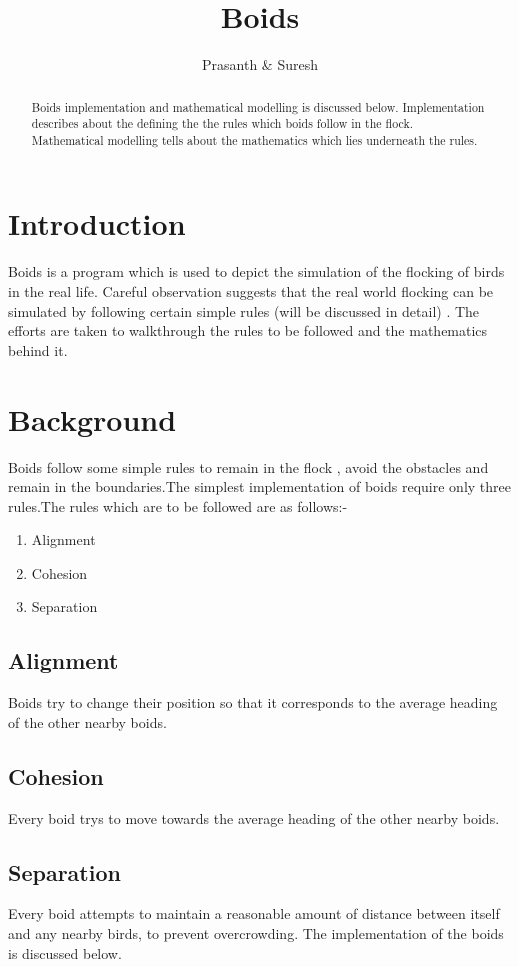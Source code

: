 \documentclass[a4paper]{article}
\title{Boids}
\author{Prasanth \& Suresh}
\begin{document}
\maketitle

\begin{abstract}
Boids implementation and mathematical modelling is discussed below. Implementation describes about the defining the
the rules which boids follow in the flock. Mathematical modelling tells about the mathematics which lies underneath the rules.
\end{abstract}

\section{Introduction}

Boids is a program which is used to depict the simulation of the flocking of birds in the real life. Careful observation suggests that the real world flocking can be simulated by following certain simple rules (will be discussed in detail) . The efforts are taken to walkthrough the rules to be followed and the mathematics behind it.

\section{Background}
Boids follow some simple rules to remain in the flock , avoid the obstacles and remain in the boundaries.The simplest implementation of boids require only three rules.The rules which are to be followed are as follows:-
\begin{enumerate}
\item Alignment
\item Cohesion
\item Separation
\end{enumerate}

\subsection{Alignment}
Boids try to change their position so that it corresponds to the average heading of the other nearby boids.
\subsection{Cohesion}
Every boid trys to move towards the average heading of the other nearby boids.
\subsection{Separation}
Every boid attempts to maintain a reasonable amount of distance between itself and any nearby birds, to prevent overcrowding.
The implementation of the boids is discussed below.
\end{document}
